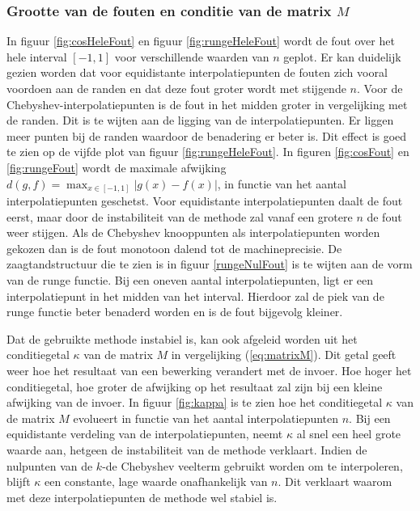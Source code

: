 \documentclass[a4paper, 12pt, titlepage, fleqn]{article}
\begin{document}
\subsubsection{Grootte van de fouten en conditie van de matrix $M$}
In figuur \ref{fig:cosHeleFout} en figuur \ref{fig:rungeHeleFout} wordt de fout over het hele interval $[-1,1]$ voor verschillende waarden van $n$ geplot. Er kan duidelijk gezien worden dat voor equidistante interpolatiepunten de fouten zich vooral voordoen aan de randen en dat deze fout groter wordt met stijgende $n$. Voor de Chebyshev-interpolatiepunten is de fout in het midden groter in vergelijking met de randen. Dit is te wijten aan de ligging van de interpolatiepunten. Er liggen meer punten bij de randen waardoor de benadering er beter is. Dit effect is goed te zien op de vijfde plot van figuur \ref{fig:rungeHeleFout}.
In figuren \ref{fig:cosFout} en \ref{fig:rungeFout} wordt de maximale afwijking $d(g,f) = \max_{x\in [-1,1]} | g(x) - f(x)|$, in functie van het aantal interpolatiepunten geschetst. Voor equidistante interpolatiepunten daalt de fout eerst, maar door de instabiliteit van de methode zal vanaf een grotere $n$ de fout weer stijgen. Als de Chebyshev knooppunten als interpolatiepunten worden gekozen dan is de fout monotoon dalend tot de machineprecisie. De zaagtandstructuur die te zien is in figuur \ref{rungeNulFout} is te wijten aan de vorm van de runge functie. Bij een oneven aantal interpolatiepunten, ligt er een interpolatiepunt in het midden van het interval. Hierdoor zal de piek van de runge functie beter benaderd worden en is de fout bijgevolg kleiner.
 
Dat de gebruikte methode instabiel is, kan ook afgeleid worden uit het conditiegetal $\kappa$ van de matrix $M$ in vergelijking (\ref{eq:matrixM}). Dit getal geeft weer hoe het resultaat van een bewerking verandert met de invoer. Hoe hoger het conditiegetal, hoe groter de afwijking op het resultaat zal zijn bij een kleine afwijking van de invoer. In figuur \ref{fig:kappa} is te zien hoe het conditiegetal $\kappa$ van de matrix $M$ evolueert in functie van het aantal interpolatiepunten $n$. Bij een equidistante verdeling van de interpolatiepunten, neemt $\kappa$ al snel een heel grote waarde aan, hetgeen de instabiliteit van de methode verklaart. Indien de nulpunten van de $k$-de Chebyshev veelterm gebruikt worden om te interpoleren, blijft $\kappa$ een constante, lage waarde onafhankelijk van $n$. Dit verklaart waarom met deze interpolatiepunten de methode wel stabiel is.
\end{document}
